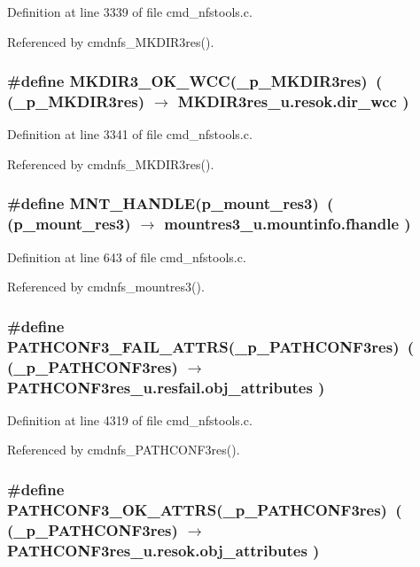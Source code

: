 Definition at line 3339 of file cmd\_\-nfstools.c.

Referenced by cmdnfs\_\-MKDIR3res().
\subsubsection{\setlength{\rightskip}{0pt plus 5cm}\#define MKDIR3\_\-OK\_\-WCC(\_\-p\_\-MKDIR3res)\ ( (\_\-p\_\-MKDIR3res) $\rightarrow$ MKDIR3res\_\-u.resok.dir\_\-wcc )}\label{cmd__nfstools_8c_a31}




Definition at line 3341 of file cmd\_\-nfstools.c.

Referenced by cmdnfs\_\-MKDIR3res().
\subsubsection{\setlength{\rightskip}{0pt plus 5cm}\#define MNT\_\-HANDLE(p\_\-mount\_\-res3)\ ( (p\_\-mount\_\-res3) $\rightarrow$ mountres3\_\-u.mountinfo.fhandle )}\label{cmd__nfstools_8c_a2}




Definition at line 643 of file cmd\_\-nfstools.c.

Referenced by cmdnfs\_\-mountres3().
\subsubsection{\setlength{\rightskip}{0pt plus 5cm}\#define PATHCONF3\_\-FAIL\_\-ATTRS(\_\-p\_\-PATHCONF3res)\ ( (\_\-p\_\-PATHCONF3res) $\rightarrow$ PATHCONF3res\_\-u.resfail.obj\_\-attributes )}\label{cmd__nfstools_8c_a56}




Definition at line 4319 of file cmd\_\-nfstools.c.

Referenced by cmdnfs\_\-PATHCONF3res().
\subsubsection{\setlength{\rightskip}{0pt plus 5cm}\#define PATHCONF3\_\-OK\_\-ATTRS(\_\-p\_\-PATHCONF3res)\ ( (\_\-p\_\-PATHCONF3res) $\rightarrow$ PATHCONF3res\_\-u.resok.obj\_\-attributes )}\label{cmd__nfstools_8c_a54}




